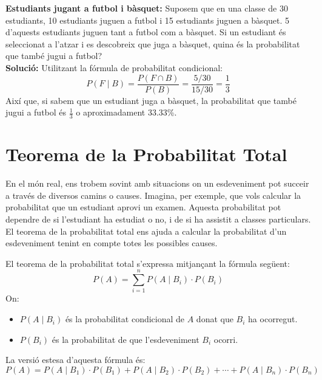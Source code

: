\documentclass[12pt]{article}
\begin{document}
\begin{exemple}  [title=Exemple 2] \noindent 
\textbf{Estudiants jugant a futbol i bàsquet:}  
Suposem que en una classe de 30 estudiants, 10 estudiants juguen a futbol i 15 estudiants juguen a bàsquet. 5 d'aquests estudiants juguen tant a futbol com a bàsquet. Si un estudiant és seleccionat a l'atzar i es descobreix que juga a bàsquet, quina és la probabilitat que també jugui a futbol? \\

\textbf{Solució:}  
Utilitzant la fórmula de probabilitat condicional:
\[
P(F \mid B) = \frac{P(F \cap B)}{P(B)} = \frac{5/30}{15/30} = \frac{1}{3}
\]
Així que, si sabem que un estudiant juga a bàsquet, la probabilitat que també jugui a futbol és $\frac{1}{3}$ o aproximadament 33.33\%.
\end{exemple}

\newpage

\section{Teorema de la Probabilitat Total}

\begin{concept}  [title=Introducció] \noindent
En el món real, ens trobem sovint amb situacions on un esdeveniment pot succeir a través de diversos camins o causes. Imagina, per exemple, que vols calcular la probabilitat que un estudiant aprovi un examen. Aquesta probabilitat pot dependre de si l'estudiant ha estudiat o no, i de si ha assistit a classes particulars. \\

El teorema de la probabilitat total ens ajuda a calcular la probabilitat d'un esdeveniment tenint en compte totes les possibles causes.
\end{concept}

\begin{concept}  [title=Definició] \noindent
    El teorema de la probabilitat total s'expressa mitjançant la fórmula següent:
    \[
    P(A) = \sum_{i=1}^{n} P(A \mid B_i) \cdot P(B_i)
    \]
    On:
    \begin{itemize}
        \item \( P(A \mid B_i) \) és la probabilitat condicional de \( A \) donat que \( B_i \) ha ocorregut.
        \item \( P(B_i) \) és la probabilitat de que l'esdeveniment \( B_i \) ocorri.
    \end{itemize}
    La versió estesa d'aquesta fórmula és:
    \[
    P(A) = P(A \mid B_1) \cdot P(B_1) + P(A \mid B_2) \cdot P(B_2) + \cdots + P(A \mid B_n) \cdot P(B_n)
    \]
\end{concept}
\end{document}
